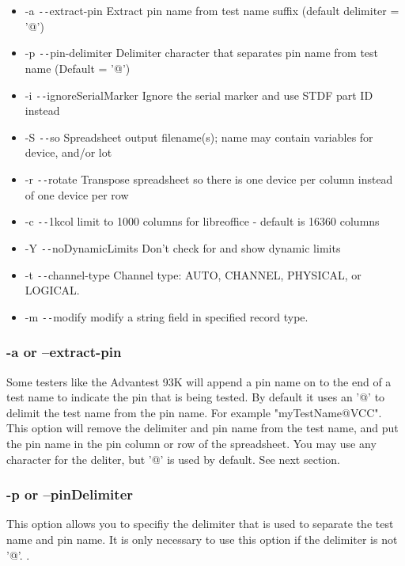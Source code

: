 \documentclass[letterpaper]{article}
\begin{document}
\begin{itemize}
\item -a        \texttt{-{}-}extract-pin Extract pin name from test name suffix (default delimiter = '@')
\item -p      \texttt{-{}-}pin-delimiter Delimiter character that separates pin name from test name (Default = '@')
\item -i \texttt{-{}-}ignoreSerialMarker Ignore the serial marker and use STDF part ID instead
\item -S                 \texttt{-{}-}so Spreadsheet output filename(s); name may contain variables for device, and/or lot
\item -r             \texttt{-{}-}rotate Transpose spreadsheet so there is one device per column instead of one device per row
\item -c              \texttt{-{}-}1kcol limit to 1000 columns for libreoffice - default is 16360 columns
\item -Y    \texttt{-{}-}noDynamicLimits Don't check for and show dynamic limits
\item -t       \texttt{-{}-}channel-type Channel type: AUTO, CHANNEL, PHYSICAL, or LOGICAL.
\item -m             \texttt{-{}-}modify modify a string field in specified record type.
\end{itemize}

\subsubsection{\bf -a or --extract-pin}
Some testers like the Advantest 93K will append a pin name on to the end of a test name
to indicate the pin that is being tested.  By default it uses an \makeatletter '@' \makeatother
to delimit the test name from the pin name.  For example \makeatletter "myTestName@VCC". \makeatother
This option will remove the delimiter and pin name from the test name, and put the pin name
in the pin column or row of the spreadsheet.  You may use any character for the deliter,
but \makeatletter '@' \makeatother is used by default.  See next section.

\subsubsection{\bf -p or --pinDelimiter}
This option allows you to specifiy the delimiter that is used to separate the test name and pin name.
It is only necessary to use this option if the delimiter is not \makeatletter '@'. \makeatother.
\clearpage
\end{document}
